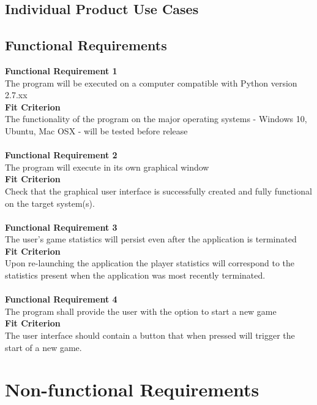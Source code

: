 \documentclass{article}
\begin{document}
		\subsection{Individual Product Use Cases}
		\subsection{Functional Requirements}
		\indent \indent \textbf {Functional Requirement 1}\\
		\indent \indent The program will be executed on a computer compatible with
		Python version 2.7.xx\\
		\indent \textbf {Fit Criterion}\\
		\indent \indent The functionality of the program on the major operating
		systems - Windows 10, Ubuntu, Mac OSX - will be tested before release\\\\
		\indent \textbf {Functional Requirement 2}\\
		\indent \indent The program will execute in its own graphical window\\
		\indent \textbf {Fit Criterion}\\
		\indent \indent Check that the graphical user interface is successfully
		created and fully functional on the target system(s).\\\\
		\indent \textbf {Functional Requirement 3}\\
		\indent \indent The user’s game statistics will persist even after the 
		application is	terminated\\
		\indent \textbf {Fit Criterion}\\
		\indent \indent Upon re-launching the application the player statistics will
		correspond to the statistics present when the application was most recently
		terminated.\\\\
		\indent \textbf {Functional Requirement 4}\\
		\indent \indent The program shall provide the user with the option to start a 
		new game\\
		\indent \textbf {Fit Criterion}\\
		\indent \indent The user interface should contain a button that when pressed 
		will trigger the start of a new game.
	
	\section{Non-functional Requirements}
\end{document}
